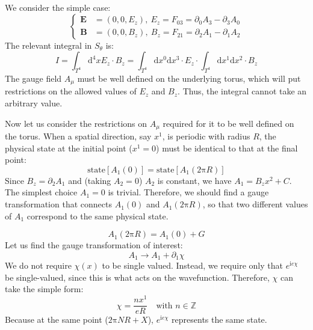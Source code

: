 We consider the simple case:
\begin{equation}
\left\{
\begin{aligned}
\bm{E} &= (0, 0, E_z), \ E_z = F_{03} = \partial_0 A_3 - \partial_3 A_0 \\
\bm{B} &= (0, 0, B_z), \ B_z = F_{21} = \partial_2 A_1 - \partial_1 A_2
\end{aligned}
\right.
\end{equation}
The relevant integral in $S_\theta$ is:
\begin{equation}
I = \int_{T^4} \mathrm{d}^4x E_z \cdot B_z = \int_{T^4} \mathrm{d}x^0 \mathrm{d}x^3 \cdot E_z \cdot \int_{T^4} \mathrm{d}x^1 \mathrm{d}x^2 \cdot B_z
\end{equation}
The gauge field $A_\mu$ must be well defined on the underlying torus, which will put restrictions on the allowed values of $E_z$ and $B_z$.
Thus, the integral cannot take an arbitrary value.

Now let us consider the restrictions on $A_\mu$ required for it to be well defined on the torus. When a spatial direction, say $x^1$, is periodic with radius $R$, the physical state at the initial point ($x^1=0$) must be identical to that at the final point:
\begin{equation}
\text{state}[A_1(0)] = \text{state}[A_1(2\mathrm{\pi} R)]
\end{equation}
Since $B_z = \partial_2 A_1$ and (taking $A_2=0$) $A_2$ is constant, we have $A_1 = B_z x^2 + C$. The simplest choice $A_1=0$ is trivial. Therefore, we should find a gauge transformation that connects $A_1(0)$ and $A_1(2\mathrm{\pi} R)$, so that two different values of $A_1$ correspond to the same physical state.

\begin{equation}
A_1(2\mathrm{\pi} R) = A_1(0) + G
\end{equation}
Let us find the gauge transformation of interest:
\begin{equation}
A_1 \to A_1 + \partial_1 \chi
\end{equation}
We do not require $\chi(x)$ to be single valued. Instead, we require only that $e^{\mathrm{i}e\chi}$ be single-valued, since this is what acts on the wavefunction. Therefore, $\chi$ can take the simple form:
\begin{equation}
\chi = \frac{n x^1}{e R} \quad \text{with } n \in \mathbb{Z}
\end{equation}
Because at the same point ($2\mathrm{\pi} NR + X$), $e^{\mathrm{i}e\chi}$ represents the same state.

